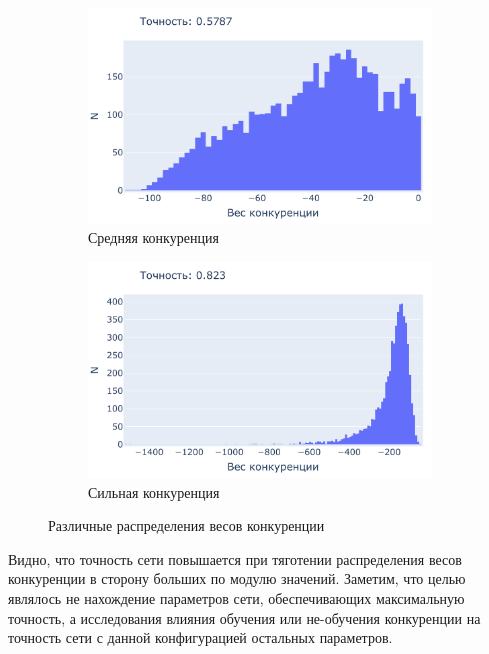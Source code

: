 \documentclass[a4paper]{article}
\begin{document}
\begin{figure}[H]
\begin{subfigure}{0.45\textwidth}
    \includegraphics[width=\textwidth,keepaspectratio=true]{competition_distribution_medium_good_ru.pdf}
    \caption{Средняя конкуренция} 
\end{subfigure}
\begin{subfigure}{0.45\textwidth}
    \includegraphics[width=\textwidth,keepaspectratio=true]{competition_distribution_best_ru.pdf}
    \caption{Сильная конкуренция}
    \label{fig:best_competition}
\end{subfigure}
\caption{Различные распределения весов конкуренции}
\label{fig:competition_distributions}
\end{figure}

Видно, что точность сети повышается при тяготении распределения весов конкуренции в сторону больших по модулю значений. Заметим, что целью являлось не нахождение параметров сети, обеспечивающих максимальную точность, а исследования влияния обучения или не-обучения конкуренции на точность сети с данной конфигурацией остальных параметров.
\end{document}

